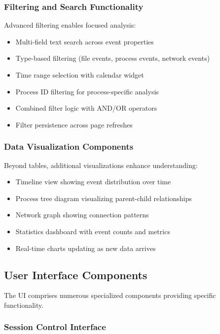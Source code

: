 \subsubsection{Filtering and Search Functionality}

Advanced filtering enables focused analysis:

\begin{itemize}
    \item Multi-field text search across event properties
    \item Type-based filtering (file events, process events, network events)
    \item Time range selection with calendar widget
    \item Process ID filtering for process-specific analysis
    \item Combined filter logic with AND/OR operators
    \item Filter persistence across page refreshes
\end{itemize}

\subsubsection{Data Visualization Components}

Beyond tables, additional visualizations enhance understanding:

\begin{itemize}
    \item Timeline view showing event distribution over time
    \item Process tree diagram visualizing parent-child relationships
    \item Network graph showing connection patterns
    \item Statistics dashboard with event counts and metrics
    \item Real-time charts updating as new data arrives
\end{itemize}

\subsection{User Interface Components}

The UI comprises numerous specialized components providing specific functionality.

\subsubsection{Session Control Interface}

